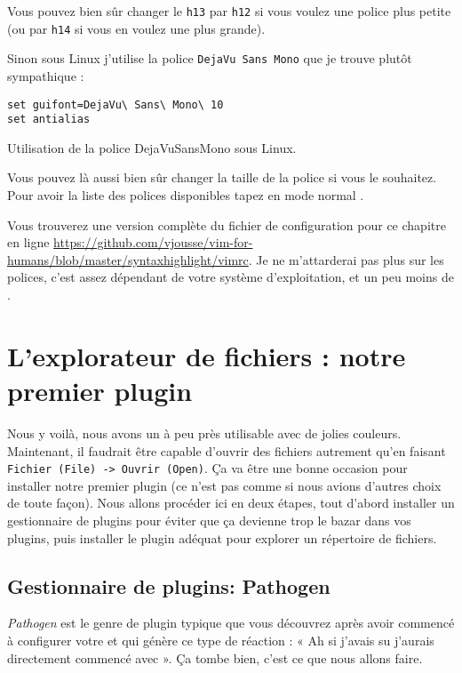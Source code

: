 Vous pouvez bien sûr changer le \Verb|h13| par \Verb|h12| si vous voulez une police plus petite (ou par \Verb|h14| si vous en voulez une plus grande).

Sinon sous Linux j'utilise la police \Verb|DejaVu Sans Mono| que je trouve plutôt sympathique :

\begin{listing}[H]
\begin{verbatim}
set guifont=DejaVu\ Sans\ Mono\ 10
set antialias
\end{verbatim}
  \caption{Utilisation de la police DejaVuSansMono sous Linux.}
  \label{lst:dejavusansmono}
\end{listing}

Vous pouvez là aussi bien sûr changer la taille de la police si vous le souhaitez. Pour avoir la liste des polices disponibles tapez en mode normal .

Vous trouverez une version complète du fichier de configuration pour ce chapitre en ligne \url{https://github.com/vjousse/vim-for-humans/blob/master/syntaxhighlight/vimrc}. Je ne m'attarderai pas plus sur les polices, c'est assez dépendant de votre système d'exploitation, et un peu moins de \vim.


\section{L'explorateur de fichiers : notre premier plugin}

Nous y voilà, nous avons un \vim à peu près utilisable avec de jolies couleurs. Maintenant, il faudrait être capable d'ouvrir des fichiers autrement qu'en faisant \Verb|Fichier (File) -> Ouvrir (Open)|. Ça va être une bonne occasion pour installer notre premier plugin (ce n'est pas comme si nous avions d'autres choix de toute façon). Nous allons procéder ici en deux étapes, tout d'abord installer un gestionnaire de plugins pour éviter que ça devienne trop le bazar dans vos plugins, puis installer le plugin adéquat pour explorer un répertoire de fichiers.

\subsection{Gestionnaire de plugins: Pathogen}

\emph{Pathogen} est le genre de plugin typique que vous découvrez après avoir commencé à configurer votre \vim et qui génère ce type de réaction : « Ah si j'avais su j'aurais directement commencé avec ». Ça tombe bien, c'est ce que nous allons faire.

